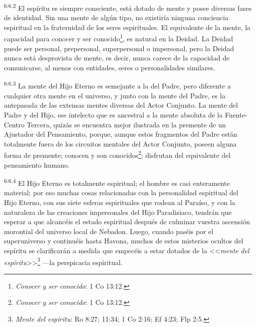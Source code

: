 \par
\textsuperscript{6:6.2} El espíritu es siempre consciente, está dotado de mente y posee diversas fases de identidad. Sin una mente de algún tipo, no existiría ninguna conciencia espiritual en la fraternidad de los seres espirituales. El equivalente de la mente, la capacidad para conocer y ser conocido\footnote{\textit{Conocer y ser conocido}: 1 Co 13:12.}, es natural en la Deidad. La Deidad puede ser personal, prepersonal, superpersonal o impersonal, pero la Deidad nunca está desprovista de mente, es decir, nunca carece de la capacidad de comunicarse, al menos con entidades, seres o personalidades similares.

\par
\textsuperscript{6:6.3} La mente del Hijo Eterno es semejante a la del Padre, pero diferente a cualquier otra mente en el universo, y junto con la mente del Padre, es la antepasada de las extensas mentes diversas del Actor Conjunto. La mente del Padre y del Hijo, ese intelecto que es ancestral a la mente absoluta de la Fuente-Centro Tercera, quizás se encuentra mejor ilustrada en la premente de un Ajustador del Pensamiento, porque, aunque estos fragmentos del Padre están totalmente fuera de los circuitos mentales del Actor Conjunto, poseen alguna forma de premente; conocen y son conocidos\footnote{\textit{Conocer y ser conocido}: 1 Co 13:12.}; disfrutan del equivalente del pensamiento humano.

\par
\textsuperscript{6:6.4} El Hijo Eterno es totalmente espiritual; el hombre es casi enteramente material; por eso muchas cosas relacionadas con la personalidad espiritual del Hijo Eterno, con sus siete esferas espirituales que rodean al Paraíso, y con la naturaleza de las creaciones impersonales del Hijo Paradisiaco, tendrán que esperar a que alcancéis el estado espiritual después de culminar vuestra ascensión morontial del universo local de Nebadon. Luego, cuando paséis por el superuniverso y continuéis hasta Havona, muchos de estos misterios ocultos del espíritu se clarificarán a medida que empecéis a estar dotados de la <<\textit{mente del espíritu}>>\footnote{\textit{Mente del espíritu}: Ro 8:27; 11:34; 1 Co 2:16; Ef 4:23; Flp 2:5.} ---la perspicacia espiritual.


